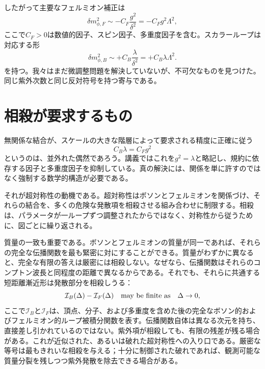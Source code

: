 \begin{classroomqa}
\end{classroomqa}

したがって主要なフェルミオン補正は
\begin{equation}
\delta m_{\phi,F}^2
\sim -C_F\frac{g^2}{\delta^2}
=-C_Fg^2\Lambda^2,
\end{equation}
ここで\(C_F>0\)は数値的因子、スピン因子、多重度因子を含む。スカラーループは対応する形
\begin{equation}
\delta m_{\phi,B}^2
\sim+C_B\frac{\lambda}{\delta^2}
=+C_B\lambda\Lambda^2.
\end{equation}
を持つ。我々はまだ微調整問題を解決していないが、不可欠なものを見つけた。同じ紫外次数と同じ反対符号を持つ寄与である。

\section{相殺が要求するもの}

無関係な結合が、スケールの大きな階層によって要求される精度に正確に従う
\begin{equation}
C_B\lambda=C_Fg^2
\end{equation}
というのは、並外れた偶然であろう。講義ではこれを\(g^2=\lambda\)と略記し、規約に依存する因子と多重度因子を抑制している。真の解決には、関係を単に許すのではなく強制する数学的構造が必要である。

それが超対称性の動機である。超対称性はボソンとフェルミオンを関係づけ、それらの結合を、多くの危険な発散項を相殺させる組み合わせに制限する。相殺は、パラメータが一ループずつ調整されたからではなく、対称性から従うために、図ごとに繰り返される。

質量の一致も重要である。ボソンとフェルミオンの質量が同一であれば、それらの完全な伝播関数を最も緊密に対にすることができる。質量がわずかに異なると、完全な有限の答えは厳密には相殺しない。なぜなら、伝播関数はそれらのコンプトン波長と同程度の距離で異なるからである。それでも、それらに共通する短距離漸近形は発散部分を相殺しうる：
\begin{equation}
\mathcal I_B(\Delta)-\mathcal I_F(\Delta)
\quad\hbox{may be finite as}\quad \Delta\to0,
\end{equation}
ここで\(\mathcal I_B\)と\(\mathcal I_F\)は、頂点、分子、および多重度を含めた後の完全なボソン的およびフェルミオン的ループ被積分関数を表す。伝播関数自体は異なる次元を持ち、直接差し引かれているのではない。紫外項が相殺しても、有限の残差が残る場合がある。これが近似された、あるいは破れた超対称性への入り口である。厳密な等号は最もきれいな相殺を与える；十分に制御された破れであれば、観測可能な質量分裂を残しつつ紫外発散を除去できる場合がある。

